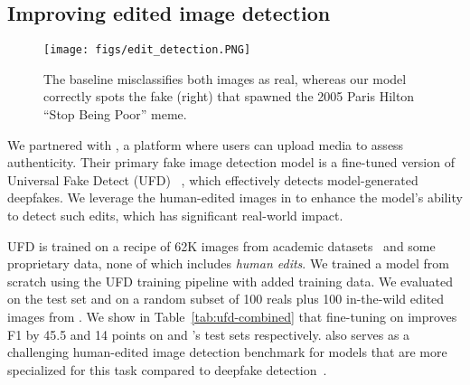 \subsection{Improving edited image detection}


\begin{figure}[!t]
\label{paris}
\centering\texttt{[image: figs/edit\_detection.PNG]}
\caption{The baseline misclassifies both images as real, whereas our model correctly spots the fake (right) that spawned the 2005 Paris Hilton ``Stop Being Poor'' meme.}
\end{figure}

We partnered with \truemedia, a platform where users can upload media to assess authenticity. Their primary fake image detection model is a fine-tuned version of Universal Fake Detect (UFD) ~\cite{ojha2024universalfakeimagedetectors}, which effectively detects model-generated deepfakes. 
We leverage the human-edited images in \RealEdit to enhance the model’s ability to detect such edits, which has significant real-world impact. 

UFD is trained on a recipe of 62K images from academic datasets~\cite{wang2023diffusiondblargescalepromptgallery, karras2019style, karras2020analyzingimprovingimagequality, karras2018progressivegrowinggansimproved, lin2015microsoftcococommonobjects, sdfd} and some proprietary data, none of which includes \textit{human edits}. We trained a model from scratch using the UFD training pipeline with added \RealEdit training data. We evaluated on the \RealEdit test set and on a random subset of 100 reals plus 100 in-the-wild edited images from \truemedia.
We show in Table~\ref{tab:ufd-combined} that fine-tuning on \RealEdit improves F1 by 45.5 and 14 points on \RealEdit and \truemedia's test sets respectively.
\RealEdit also serves as a challenging human-edited image detection benchmark for models that are more specialized for this task compared to deepfake detection~\cite{triaridis2024mmfusioncombiningimageforensic, zhang2023editguardversatileimagewatermarking, 6625374, Zhang_2024}.






